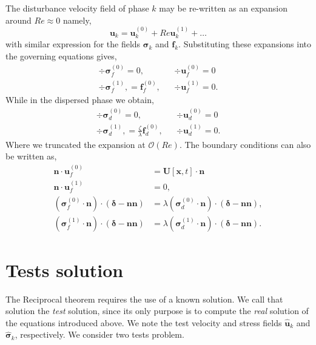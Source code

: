 The disturbance velocity field of phase $k$ may be re-written as an expansion around $Re \approx 0$ namely, 
\begin{equation*}
    \textbf{u}_k = \textbf{u}_k^{(0)} + Re \textbf{u}_k^{(1)} + \ldots
\end{equation*}
with similar expression for the fields $\bm\sigma_k$ and $\textbf{f}_k$. 
Substituting these expansions into the governing equations gives,
\begin{align}
    \div\bm\sigma_f^{(0)}
    = 0,
    && \div \textbf{u}_f^{(0)} = 0 
    \label{eq:zeroth_order_NS_f}
    \\
    \div\bm\sigma_f^{(1)},
    =  \textbf{f}_f^{(0)},
    && \div \textbf{u}_f^{(1)} = 0.  
    \label{eq:first_order_NS_f}
\end{align}
While in the dispersed phase we obtain, 
\begin{align}
    \div\bm\sigma_d^{(0)}
    = 0,
    && \div \textbf{u}_d^{(0)} = 0 
    \label{eq:zeroth_order_NS_d}
    \\
    \div\bm\sigma_d^{(1)},
    = \frac{\zeta}{\lambda} \textbf{f}_d^{(0)},
    && \div \textbf{u}_d^{(1)} = 0. 
    \label{eq:first_order_NS_f}
\end{align}
Where we truncated the expansion at $\mathcal{O}(Re)$.  
The boundary conditions can also be written as, 
\begin{align}
    \textbf{n}\cdot\textbf{u}_f^{(0)}
    &= \textbf{U}[\textbf{x},t]\cdot \textbf{n} \\
    \textbf{n}\cdot\textbf{u}_f^{(1)}
    &= 0, \\
    \label{eq:bc_non_inertia}
    (\bm\sigma_f^{(0)}\cdot\textbf{n})\cdot (\bm\delta - \textbf{nn})
    &= \lambda (\bm\sigma_d^{(0)}\cdot \textbf{n})\cdot (\bm\delta - \textbf{nn}),\\
    (\bm\sigma_f^{(1)}\cdot\textbf{n})\cdot (\bm\delta - \textbf{nn})
    &= \lambda (\bm\sigma_d^{(1)}\cdot \textbf{n})\cdot (\bm\delta - \textbf{nn}). 
    \label{eq:bc_inertial}
\end{align}


\section{Tests solution}

The Reciprocal theorem requires the use of a known solution.
We call that solution the \textit{test} solution, since its only purpose is to compute the \textit{real} solution of the equations introduced above. 
We note the test velocity and stress fields $\hat{\textbf{u}}_k$ and $\hat{\bm\sigma}_k$, respectively. 
We consider two tests problem.
